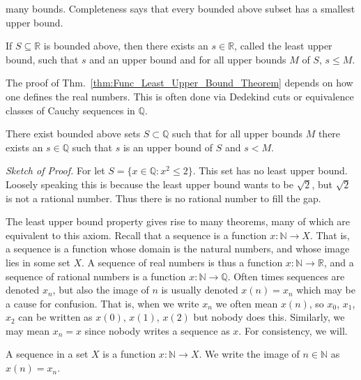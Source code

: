     many bounds. Completeness says that every bounded above subset has a
    smallest upper bound.
    \begin{theorem}
        \label{thm:Func_Least_Upper_Bound_Theorem}%
        If $S\subseteq{\mathbb{R}}$ is bounded above, then there exists an
        $s\in\mathbb{R}$, called the least upper bound, such that $s$ and an
        upper bound and for all upper bounds $M$ of $S$, $s\leq{M}$.
    \end{theorem}
    The proof of Thm.~\ref{thm:Func_Least_Upper_Bound_Theorem} depends on how
    one defines the real numbers. This is often done via Dedekind cuts or
    equivalence classes of Cauchy sequences in $\mathbb{Q}$.
    \begin{theorem}
        There exist bounded above sets $S\subset\mathbb{Q}$ such that for all
        upper bounds $M$ there exists an $s\in\mathbb{Q}$ such that $s$ is an
        upper bound of $S$ and $s<M$.
    \end{theorem}
    \textit{Sketch of Proof.}
    For let $S=\{x\in\mathbb{Q}:x^{2}\leq{2}\}$. This set has no least upper
    bound. Loosely speaking this is because the least upper bound wants to be
    $\sqrt{2}$, but $\sqrt{2}$ is not a rational number. Thus there is no
    rational number to fill the gap.
    \par\hfill\par
    The least upper bound property gives rise
    to many theorems, many of which are equivalent
    to this axiom. Recall that a sequence is a
    function $x:\mathbb{N}\rightarrow{X}$. That is,
    a sequence is a function whose domain is the
    natural numbers, and whose image lies in some
    set $X$. A sequence of real numbers is thus a
    function $x:\mathbb{N}\rightarrow\mathbb{R}$,
    and a sequence of rational numbers is a function
    $x:\mathbb{N}\rightarrow\mathbb{Q}$.
    Often times sequences are denoted $x_{n}$,
    but also the image of $n$ is usually
    denoted $x(n)=x_{n}$ which may be a cause
    for confusion. That is, when we write $x_{n}$
    we often mean $x(n)$, so $x_{0}$, $x_{1}$,
    $x_{2}$ can be written as $x(0)$, $x(1)$,
    $x(2)$ but nobody does this. Similarly,
    we may mean $x_{n}=x$ since nobody writes
    a sequence as $x$. For consistency, we will.
    \begin{definition}
        A sequence in a set $X$ is a function
        $x:\mathbb{N}\rightarrow{X}$.
        We write the image of $n\in\mathbb{N}$
        as $x(n)=x_{n}$.
    \end{definition}
